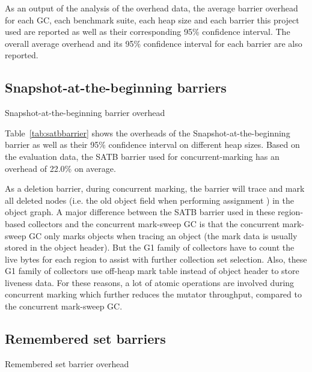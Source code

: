 As an output of the analysis of the overhead data, the average barrier overhead
for each GC, each benchmark suite, each heap size and each barrier this project used are reported
as well as their corresponding 95\% confidence interval.
The overall average overhead and its 95\% confidence interval for each barrier are also reported.

\subsection{Snapshot-at-the-beginning barriers}

\begin{table*}
  \centering
  
  \caption{Snapshot-at-the-beginning barrier overhead}
  \label{tab:satbbarrier}
\end{table*}

Table~\ref{tab:satbbarrier} shows the overheads of the Snapshot-at-the-beginning barrier
as well as their 95\% confidence interval on different heap sizes.
Based on the evaluation data, the SATB barrier used for concurrent-marking
has an overhead of 22.0\% on average.

As a deletion barrier, during concurrent marking, the barrier will trace and mark
all deleted nodes (i.e. the old object field when performing assignment ) in the object graph.
A major difference between the SATB barrier used in these region-based collectors and
the concurrent mark-sweep GC is that the concurrent mark-sweep GC only marks objects
when tracing an object (the mark data is usually stored in the object header).
But the G1 family of collectors have to count the live bytes
for each region to assist with further collection set selection.
Also, these G1 family of collectors use off-heap mark table instead of object header to store
liveness data. For these reasons, a lot of atomic operations are involved during concurrent
marking which further reduces the mutator throughput, compared to the concurrent mark-sweep GC.

\subsection{Remembered set barriers}

\begin{table*}
  \centering
  
  \caption{Remembered set barrier overhead}
  \label{tab:remsetbarrier}
\end{table*}

